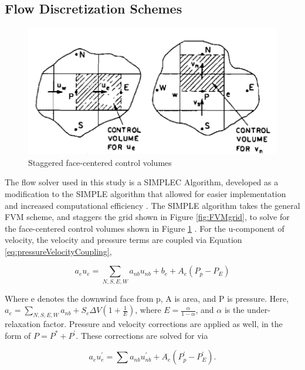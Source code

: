 \documentclass{UCF_ETD}
\begin{document}
\subsection{Flow Discretization Schemes}
\begin{figure}
    \centering
    \includegraphics{Figures/faceCenteredCVs.png}
    \caption{Staggered face-centered control volumes}
    \label{fig:faceCenterCVs}
\end{figure}

The flow solver used in this study is a SIMPLEC Algorithm, developed as a modification to the SIMPLE algorithm that allowed for easier implementation and increased computational efficiency \cite{SIMPLEC}. The SIMPLE algorithm takes the general FVM scheme, and staggers the grid shown in Figure \ref{fig:FVMgrid}, to solve for the face-centered control volumes shown in Figure \ref{fig:faceCenterCVs} \cite{Patankar1972ACP}. For the u-component of velocity, the velocity and pressure terms are coupled via Equation \ref{eq:pressureVelocityCoupling},


\begin{equation}
    a_eu_e=\sum_{N,S,E,W}{a_{nb}u_{nb}+b_e+A_e\left(P_p-P_E\right)}
    \label{eq:pressureVelocityCoupling}
\end{equation}

Where e denotes the downwind face from p, A is area, and P is pressure. Here, \\ $a_e=\sum_{N,S,E,W}{a_{nb}+S_e\Delta V}\left(1+\frac{1}{E}\right)$, where $E=\frac{\alpha}{1-\alpha}$, and $\alpha$ is the under-relaxation factor. Pressure and velocity corrections are applied as well, in the form of $P=P^\ast+P^\prime$. These corrections are solved for via 

\begin{equation}
    a_eu_e^\prime=\sum{a_{nb}u_{nb}^\prime}+A_e\left(P_p^\prime-P_E^\prime\right).
    \label{eq:pressureCorrections}
\end{equation} 
\end{document}
